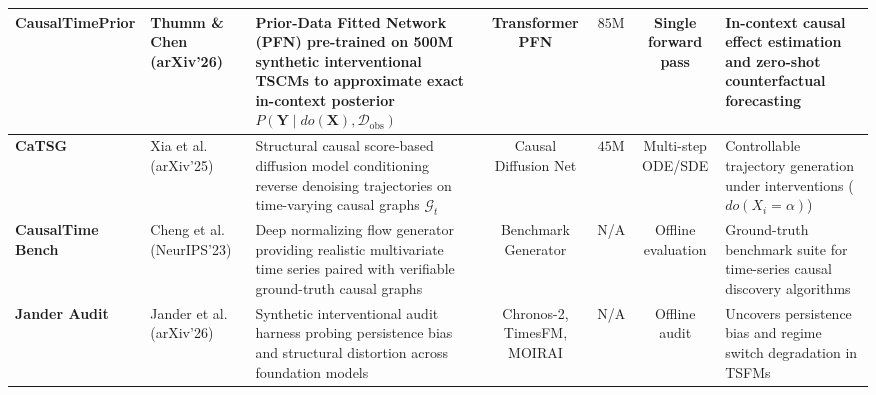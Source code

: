 \begin{table}[t]
{\begin{tabular}{lp{2.4cm}p{4.2cm}cccp{3.8cm}}
\midrule
\textbf{CausalTimePrior} & Thumm \& Chen~\cite{thumm2026interventional} (arXiv'26) & Prior-Data Fitted Network (PFN) pre-trained on 500M synthetic interventional TSCMs to approximate exact in-context posterior $P(\mathbf{Y} \mid do(\mathbf{X}), \mathcal{D}_{\text{obs}})$ & Transformer PFN & $85\text{M}$ & Single forward pass & In-context causal effect estimation and zero-shot counterfactual forecasting \\
\midrule
\textbf{CaTSG} & Xia et al.~\cite{xia2025causal} (arXiv'25) & Structural causal score-based diffusion model conditioning reverse denoising trajectories on time-varying causal graphs $\mathcal{G}_t$ & Causal Diffusion Net & $45\text{M}$ & Multi-step ODE/SDE & Controllable trajectory generation under interventions ($do(X_i = \alpha)$) \\
\midrule
\textbf{CausalTime Bench} & Cheng et al.~\cite{cheng2023causaltime} (NeurIPS'23) & Deep normalizing flow generator providing realistic multivariate time series paired with verifiable ground-truth causal graphs & Benchmark Generator & N/A & Offline evaluation & Ground-truth benchmark suite for time-series causal discovery algorithms \\
\midrule
\textbf{Jander Audit} & Jander et al.~\cite{jander2026causal} (arXiv'26) & Synthetic interventional audit harness probing persistence bias and structural distortion across foundation models & Chronos-2, TimesFM, MOIRAI & N/A & Offline audit & Uncovers persistence bias and regime switch degradation in TSFMs \\
\bottomrule
\end{tabular}
}
\end{table}

